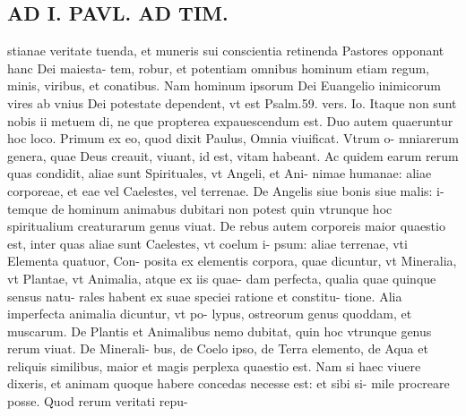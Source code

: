 \documentclass{article}
\begin{document}
\begin{pages}
\section*{AD I. PAVL. AD TIM. }
\marginpar{[ p.470 ]}\pstart stianae veritate tuenda, et muneris sui conscientia retinenda Pastores opponant hanc Dei maiesta- tem, robur, et potentiam omnibus hominum etiam regum, minis, viribus, et conatibus. Nam hominum ipsorum Dei Euangelio inimicorum vires ab vnius Dei potestate dependent, vt est Psalm.59. vers. Io. Itaque non sunt nobis ii metuem di, ne que propterea expauescendum est.  \pend\pstart Duo autem quaeruntur hoc loco. Primum ex eo, quod dixit Paulus, Omnia viuificat. Vtrum o- mniarerum genera, quae Deus creauit, viuant, id est, vitam habeant. Ac quidem earum rerum quas condidit, aliae sunt Spirituales, vt Angeli, et Ani- nimae humanae: aliae corporeae, et eae vel Caelestes, vel terrenae. De Angelis siue bonis siue malis: i- temque de hominum animabus dubitari non potest quin vtrunque  hoc spiritualium creaturarum genus viuat. De rebus autem corporeis maior quaestio est, inter quas aliae sunt Caelestes, vt coelum i- psum: aliae terrenae, vti Elementa quatuor, Con- posita ex elementis corpora, quae dicuntur, vt Mineralia, vt Plantae, vt Animalia, atque  ex iis quae- dam perfecta, qualia quae quinque sensus natu- rales habent ex suae speciei ratione et constitu- tione. Alia imperfecta animalia dicuntur, vt po- lypus, ostreorum genus quoddam, et muscarum. De Plantis et Animalibus nemo dubitat, quin hoc vtrunque genus rerum viuat. De Minerali- bus, de Coelo ipso, de Terra elemento, de Aqua et reliquis similibus, maior et magis perplexa quaestio est. Nam si haec viuere dixeris, et animam quoque habere concedas necesse est: et sibi si- mile procreare posse. Quod rerum veritati repu-  \pend

\end{pages}
\end{document}
